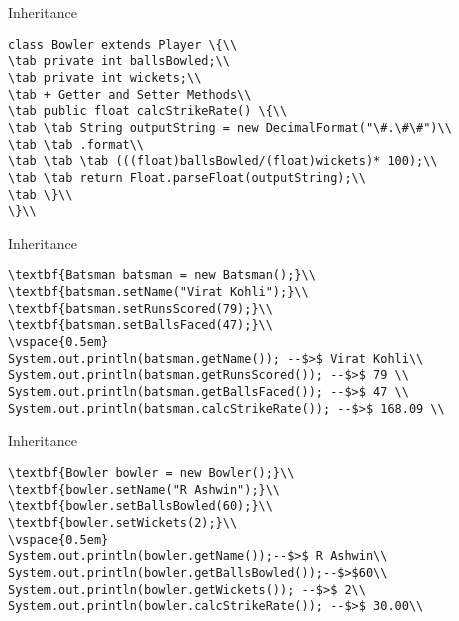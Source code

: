\documentclass[aspectratio=169,14pt,usenames,dvipsnames]{beamer}
\newcommand\tab[1][1cm]{\hspace*{#1}}
\begin{document}
\begin{frame}{Inheritance}
\begin{lstlisting}
class Bowler extends Player \{\\
\tab private int ballsBowled;\\
\tab private int wickets;\\
\tab + Getter and Setter Methods\\
\tab public float calcStrikeRate() \{\\
\tab \tab String outputString = new DecimalFormat("\#.\#\#")\\
\tab \tab .format\\
\tab \tab \tab (((float)ballsBowled/(float)wickets)* 100);\\
\tab \tab return Float.parseFloat(outputString);\\
\tab \}\\
\}\\
\end{lstlisting}
\end{frame}

\begin{frame}{Inheritance}
\begin{lstlisting}
\textbf{Batsman batsman = new Batsman();}\\
\textbf{batsman.setName("Virat Kohli");}\\
\textbf{batsman.setRunsScored(79);}\\
\textbf{batsman.setBallsFaced(47);}\\
\vspace{0.5em}
System.out.println(batsman.getName()); --$>$ Virat Kohli\\
System.out.println(batsman.getRunsScored()); --$>$ 79 \\
System.out.println(batsman.getBallsFaced()); --$>$ 47 \\
System.out.println(batsman.calcStrikeRate()); --$>$ 168.09 \\
\end{lstlisting}
\end{frame}


\begin{frame}{Inheritance}
\begin{lstlisting}
\textbf{Bowler bowler = new Bowler();}\\
\textbf{bowler.setName("R Ashwin");}\\
\textbf{bowler.setBallsBowled(60);}\\
\textbf{bowler.setWickets(2);}\\
\vspace{0.5em}
System.out.println(bowler.getName());--$>$ R Ashwin\\
System.out.println(bowler.getBallsBowled());--$>$60\\
System.out.println(bowler.getWickets()); --$>$ 2\\
System.out.println(bowler.calcStrikeRate()); --$>$ 30.00\\
\end{lstlisting}
\end{frame}
\end{document}
